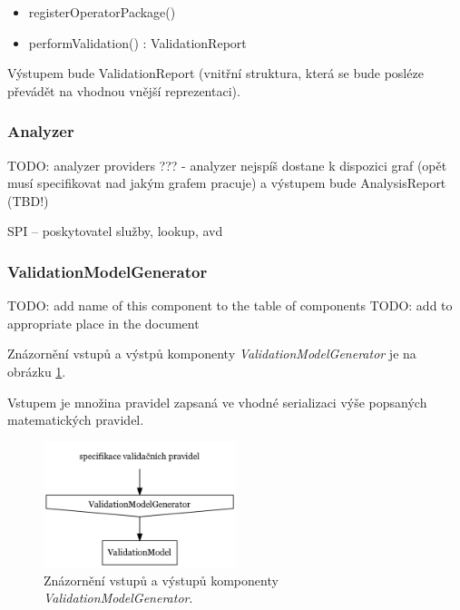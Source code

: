\begin{itemize}
\item registerOperatorPackage()
\item performValidation() : ValidationReport
\end{itemize}

Výstupem bude ValidationReport (vnitřní struktura, která se bude posléze převádět na vhodnou vnější reprezentaci).

\subsubsection{Analyzer}
TODO: analyzer providers ??? - analyzer nejspíš dostane k dispozici graf (opět musí specifikovat nad jakým grafem pracuje) a výstupem bude AnalysisReport (TBD!)

SPI -- poskytovatel služby, lookup, avd

\subsubsection{ValidationModelGenerator}
TODO: add name of this component to the table of components
TODO: add to appropriate place in the document

Znázornění vstupů a výstpů komponenty \emph{ValidationModelGenerator} je na obrázku \ref{design-validation_model_generator_io}.

Vstupem je množina pravidel zapsaná ve vhodné serializaci výše popsaných matematických pravidel.

\begin{figure}[h!]
  \centering
  \includegraphics[width=0.5\textwidth]{./graphs/validation_model_generator_io_graph.png}
  \caption{Znázornění vstupů a výstupů komponenty \emph{ValidationModelGenerator}.\label{design-validation_model_generator_io}}
\end{figure}

